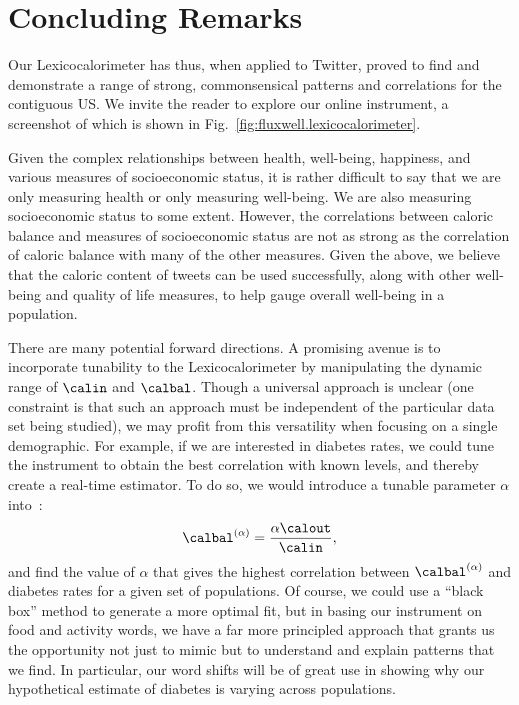 \section*{Concluding Remarks}
\label{sec:fluxwell.conclusion}



Our Lexicocalorimeter
has thus, when applied to Twitter,
proved to find and demonstrate 
a range of strong, commonsensical 
patterns and correlations for the contiguous US.
We invite the reader to explore our online instrument,
a screenshot of which is shown in Fig.~\ref{fig:fluxwell.lexicocalorimeter}.

Given the complex relationships between health,
well-being, happiness, and various measures of socioeconomic status,
it is rather difficult to say that we are only measuring health or
only measuring well-being.  We are also measuring socioeconomic
status to some extent.  However, the correlations between caloric
balance and measures of socioeconomic status are not as strong as the
correlation of caloric balance with many of the other measures.
Given the above, we believe that the caloric content of
tweets can be used successfully, along with other well-being and
quality of life measures, to help gauge overall well-being in a population.

There are many potential forward directions.
A promising avenue is to incorporate tunability to
the Lexicocalorimeter by manipulating the dynamic
range of $\calin$ and $\calbal$. 
Though a universal approach is unclear 
(one constraint is that such an approach must be independent of the particular data set being studied),
we may profit from this versatility when
focusing on a single demographic.
For example, if we are interested in diabetes rates,
we could tune the instrument to obtain the best correlation
with known levels, and thereby create a real-time
estimator.  
To do so, we would introduce a tunable parameter $\alpha$
into~:
\begin{equation}
  \calbal^{(\alpha)}
  = 
  \frac{\alpha\calout}{\calin},
  \label{eq:fluxwell.calbalalpha}
\end{equation}
and find the value of $\alpha$ that gives the highest
correlation between $\calbal^{(\alpha)}$ and diabetes
rates for a given set of populations.
Of course, we could use a ``black box'' method to generate
a more optimal fit, but in basing our instrument on food and activity
words, we have a far more principled approach that grants us
the opportunity not just to mimic but to understand and explain patterns that we find.
In particular, our word shifts will be of great use in showing why
our hypothetical estimate of diabetes is varying across populations.

